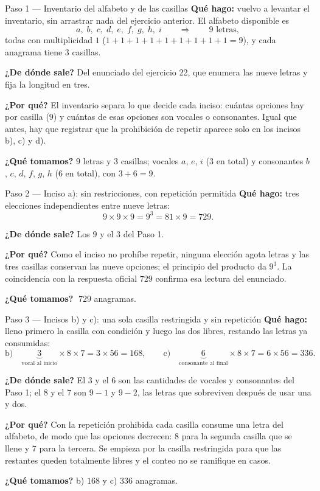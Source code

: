 \documentclass[11pt]{article}
\begin{document}
\begin{paso}{Paso 1 --- Inventario del alfabeto y de las casillas}
\textbf{Qué hago:} vuelvo a levantar el inventario, sin arrastrar nada del ejercicio anterior. El alfabeto
disponible es
\[
a,\;b,\;c,\;d,\;e,\;f,\;g,\;h,\;i\qquad\Longrightarrow\qquad 9 \text{ letras},
\]
todas con multiplicidad $1$ ($1+1+1+1+1+1+1+1+1=9$), y cada anagrama tiene $3$ casillas.

\textbf{¿De dónde sale?} Del enunciado del ejercicio 22, que enumera las nueve letras y fija la longitud
en tres.

\textbf{¿Por qué?} El inventario separa lo que decide cada inciso: cuántas opciones hay por casilla ($9$)
y cuántas de esas opciones son vocales o consonantes. Igual que antes, hay que registrar que la
prohibición de repetir aparece solo en los incisos b), c) y d).

\textbf{¿Qué tomamos?} $9$ letras y $3$ casillas; vocales $a$, $e$, $i$ ($3$ en total) y consonantes
$b$, $c$, $d$, $f$, $g$, $h$ ($6$ en total), con $3+6=9$.
\end{paso}

\begin{paso}{Paso 2 --- Inciso a): sin restricciones, con repetición permitida}
\textbf{Qué hago:} tres elecciones independientes entre nueve letras:
\[
9\times9\times9=9^{3}=81\times9=729 .
\]

\textbf{¿De dónde sale?} Los $9$ y el $3$ del Paso 1.

\textbf{¿Por qué?} Como el inciso no prohíbe repetir, ninguna elección agota letras y las tres casillas
conservan las nueve opciones; el principio del producto da $9^3$. La coincidencia con la respuesta oficial
$729$ confirma esa lectura del enunciado.

\textbf{¿Qué tomamos?} $\;729$ anagramas.
\end{paso}

\begin{paso}{Paso 3 --- Incisos b) y c): una sola casilla restringida y sin repetición}
\textbf{Qué hago:} lleno primero la casilla con condición y luego las dos libres, restando las letras ya
consumidas:
\[
\text{b)}\quad \underbrace{3}_{\text{vocal al inicio}}\times 8\times 7=3\times56=168 ,
\qquad
\text{c)}\quad \underbrace{6}_{\text{consonante al final}}\times 8\times 7=6\times56=336 .
\]

\textbf{¿De dónde sale?} El $3$ y el $6$ son las cantidades de vocales y consonantes del Paso 1; el $8$ y
el $7$ son $9-1$ y $9-2$, las letras que sobreviven después de usar una y dos.

\textbf{¿Por qué?} Con la repetición prohibida cada casilla consume una letra del alfabeto, de modo que las
opciones decrecen: $8$ para la segunda casilla que se llene y $7$ para la tercera. Se empieza por la casilla
restringida para que las restantes queden totalmente libres y el conteo no se ramifique en casos.

\textbf{¿Qué tomamos?} b) $168$ y c) $336$ anagramas.
\end{paso}
\end{document}
